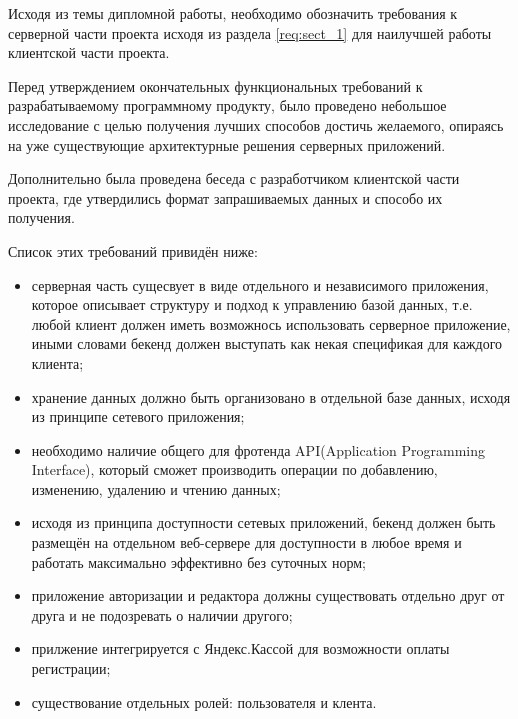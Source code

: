 \label{req:sect_2}

Исходя из темы дипломной работы, необходимо обозначить требования к серверной части проекта исходя из раздела \ref{req:sect_1} для наилучшей работы клиентской части проекта.

Перед утверждением окончательных функциональных требований к разрабатываемому программному продукту, было проведено небольшое исследование с целью получения
лучших способов достичь желаемого, опираясь на уже существующие архитектурные решения серверных приложений.

Дополнительно была проведена беседа с разработчиком клиентской части проекта, где утвердились формат запрашиваемых данных и способо их получения.

Список этих требований привидён ниже:
\begin{itemize}
    \item серверная часть сущесвует в виде отдельного и независимого приложения, которое описывает структуру и подход к управлению базой данных, т.е. любой клиент должен иметь возможнось использовать серверное приложение, иными словами бекенд должен выступать как некая спецификая для каждого клиента;
    \item хранение данных должно быть организовано в отдельной базе данных, исходя из принципе сетевого приложения;
    \item необходимо наличие общего для фротенда API(Application Programming Interface), который сможет производить операции по добавлению, изменению, удалению и чтению данных;
    \item исходя из принципа доступности сетевых приложений, бекенд должен быть размещён на отдельном веб-сервере для доступности в любое время и работать максимально эффективно без суточных норм;
    \item приложение авторизации и редактора должны существовать отдельно друг от друга и не подозревать о наличии другого;
    \item прилжение интегрируется с Яндекс.Кассой для возможности оплаты регистрации;
    \item существование отдельных ролей: пользователя и клента.
\end{itemize}
